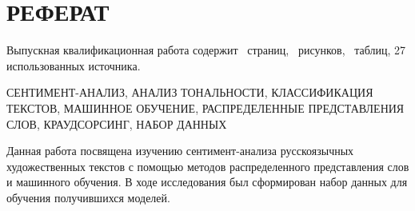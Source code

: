 \chapter*{РЕФЕРАТ}









%
%

\bigskip\par
Выпускная квалификационная работа содержит \pageref*{LastPage}~страниц, \totfig~рисунков,                                        \tottab~таблиц, 27 использованных источника.

\bigskip\par
СЕНТИМЕНТ-АНАЛИЗ, АНАЛИЗ ТОНАЛЬНОСТИ, КЛАССИФИКАЦИЯ ТЕКСТОВ, МАШИННОЕ ОБУЧЕНИЕ, РАСПРЕДЕЛЕННЫЕ ПРЕДСТАВЛЕНИЯ СЛОВ, КРАУДСОРСИНГ, НАБОР ДАННЫХ

\bigskip\par
Данная работа посвящена изучению сентимент-анализа русскоязычных художественных текстов с помощью методов распределенного представления слов и машинного обучения. В ходе исследования был сформирован набор данных для обучения получившихся моделей.

